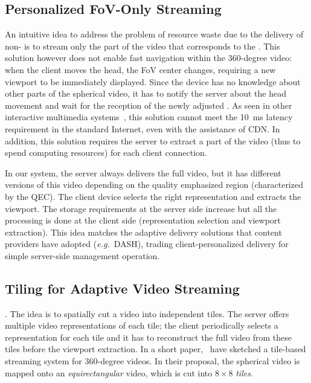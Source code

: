 \subsection{Personalized FoV-Only Streaming}

An intuitive idea to address the problem of resource waste due to the
delivery of non- is to stream only the part of the video that
corresponds to the . This solution however does not enable
fast navigation within the 360-degree video: when the client moves the
head, the FoV center changes, requiring a new viewport to be
immediately displayed. Since the device has no knowledge about other
parts of the spherical video, it has to notify the server about the
head movement and wait for the reception of the newly adjusted .
As seen in other interactive multimedia
systems~\cite{ChoyWSR14}, this solution cannot meet the \SI{10}{ms} latency
requirement in the standard Internet, even with the assistance of
\ac{CDN}. In addition, this solution requires the server to extract a
part of the video (thus to spend computing resources) for each client
connection.

In our system, the server always delivers
the full video, but it has different versions of this video depending
on the quality emphasized region (characterized by the QEC). The client device
selects the right representation and extracts the viewport. The
storage requirements at the server side increase but all the
processing is done at the client side (representation selection and
viewport extraction). This idea matches the adaptive delivery
solutions that content providers have  adopted %
(\textit{e.g.}~\ac{DASH}), trading client-personalized delivery for
simple server-side management operation.

\subsection{Tiling for Adaptive Video Streaming}
.
The idea is to
spatially cut a video into independent tiles. The server offers
multiple video representations of each tile; the client periodically
selects a representation for each tile and it has to reconstruct the
full video from these tiles before the viewport extraction.
In a short paper,~\citet{ochi_live_2015} have sketched a
tile-based streaming system for 360-degree videos. In their proposal,
the spherical video is mapped onto an \emph{equirectangular} video,
which is cut into $8\!\times\! 8$ \emph{tiles}.

